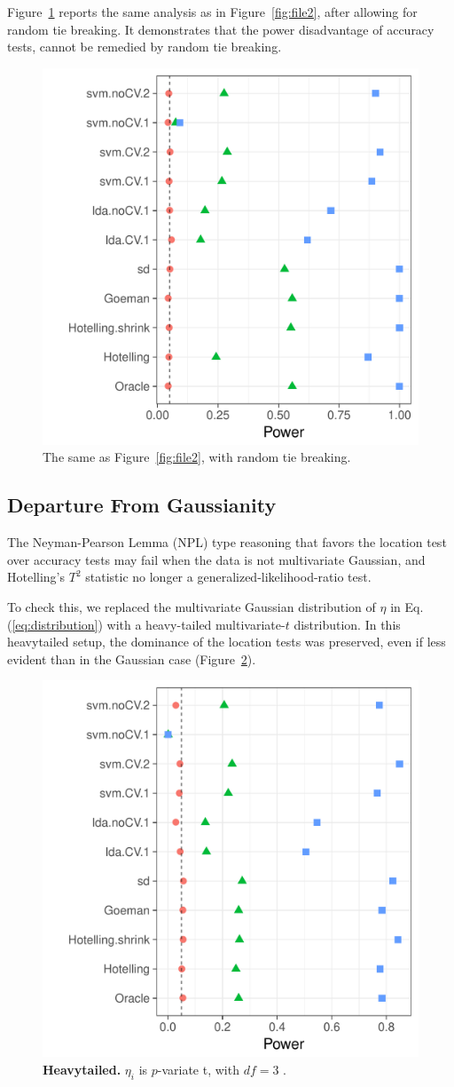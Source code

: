 \documentclass[12pt,a4paper]{article}
\begin{document}
Figure~\ref{fig:file33} reports the same analysis as in Figure~\ref{fig:file2}, after allowing for random tie breaking. 
It demonstrates that the power disadvantage of accuracy tests, cannot be remedied by random tie breaking.

\begin{figure}[ht]
	\centering
	\includegraphics[width=0.5\linewidth]{art/file33}
	\caption{The same as Figure~\ref{fig:file2}, with random tie breaking.}
	\label{fig:file33}
\end{figure}



\subsection{Departure From Gaussianity}
The Neyman-Pearson Lemma (NPL) type reasoning that favors the location test over accuracy tests may fail when the data is not multivariate Gaussian, and Hotelling's $T^2$ statistic no longer a generalized-likelihood-ratio test. 

To check this, we replaced the multivariate Gaussian distribution of $\eta$ in Eq.(\ref{eq:distribution}) with a heavy-tailed multivariate-$t$ distribution. 
In this heavytailed setup, the dominance of the location tests was preserved, even if less evident than in the Gaussian case (Figure~\ref{fig:t_null}).



\begin{figure}[th]
		\centering
		\includegraphics[width=0.5\linewidth]{"art/file9"}
		\caption{\textbf{Heavytailed.} $\eta_i$ is $p$-variate t, with $df=3$ .  } 
		\label{fig:t_null}
\end{figure}
\end{document}
